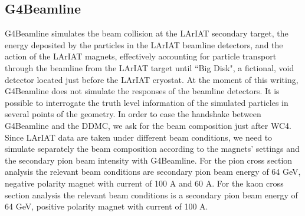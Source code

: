 \subsection{G4Beamline}\label{ch:beamlineComposition}
G4Beamline simulates the beam collision at the LArIAT secondary target, the energy deposited by the particles in the LArIAT beamline detectors, and the action of the LArIAT magnets, effectively accounting for particle transport through the beamline from the LArIAT target until ``Big Disk", a fictional, void detector located just before the LArIAT cryostat. 
 At the moment of this writing, G4Beamline does not simulate the responses of the beamline detectors. It is possible to interrogate the truth level information of the simulated particles in several points of the geometry. In order to ease the handshake between G4Beamline and the DDMC, we ask for the beam composition just after WC4.
Since LArIAT data are taken under different beam conditions, we need to simulate separately the beam composition according to the magnets' settings and the secondary pion beam intensity with G4Beamline. For the pion cross section analysis the relevant beam conditions are  secondary pion beam energy of 64 GeV, negative polarity magnet with current of 100 A and 60 A. For the kaon cross section analysis the relevant beam conditions is a secondary  pion beam energy of 64 GeV, positive polarity magnet with current of 100 A. 

